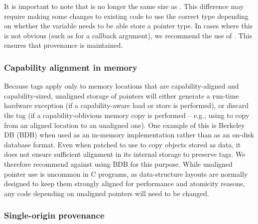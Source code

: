 \documentclass[12pt,twoside,openright,usletter]{article}
\newcommand{\ccode}[1]{{\small\ttfamily{#1}}}
\newcommand{\cfunc}[1]{{\ccode{#1()}}}
\newcommand{\sizet}{{\ccode{size\_t}}\xspace}
\newcommand{\cuintptrt}{{\ccode{uintptr\_t}}\xspace}
\newcommand{\note}[2]{{\color{blue}[ Note: #1 - #2]}}
\renewcommand{\note}[2]{\relax\ifhmode\unskip\fi}
\newcommand{\amnote}[1]{\note{#1}{Alfredo M.}}
\newcommand{\psnote}[1]{\note{#1}{Peter S.}}
\newcommand{\pgnnote}[1]{\note{#1}{Peter N.}}
\begin{document}
It is important to note that \cuintptrt is no longer the same size as
\sizet. This difference may require making some changes to
existing code to use the correct type depending on whether the variable
needs to be able store a pointer type. In cases where this is not obvious
(such as for a callback argument), we recommend the use of \cuintptrt.
This ensures that provenance is maintained.

\pgnnote{The above section begs questions relating to what is the
  responsibility of programmers and what can be aided or managed by
  compilers.  Ideally, the latter would be preferable to requiring
  programmers to understand things are are possibly beyond there so-called
  experience.}

\subsubsection{Capability alignment in memory}

Because tags apply only to memory locations that are capability-aligned
and capability-sized,
unaligned storage of pointers will either generate a run-time
hardware exception (if a capability-aware load or store is performed), or discard the
tag (if a capability-oblivious memory copy is performed -- e.g., using
\cfunc{memcpy} to copy from an aligned location to an unaligned one).
One example of this is Berkeley DB (BDB) when used as an in-memory
implementation rather than as an on-disk database format.
Even when patched to use \cfunc{memcpy} to copy objects stored as data, it
does not ensure sufficient alignment in its internal storage to preserve tags.
We therefore recommend against using BDB for this purpose.
While unaligned pointer use is uncommon in C programs, as data-structure
layouts are normally designed to keep them strongly aligned for performance
and atomicity reasons, any code depending on unaligned pointers will need
to be changed.

\amnote{Should we mention code that assumes that it is ok to go out of bounds
for optimization purposes? E.g., strcmp loading a word at a time?}
\psnote{yes}

\subsubsection{Single-origin provenance}
\label{sec:ambiguous-provenance}
\end{document}
